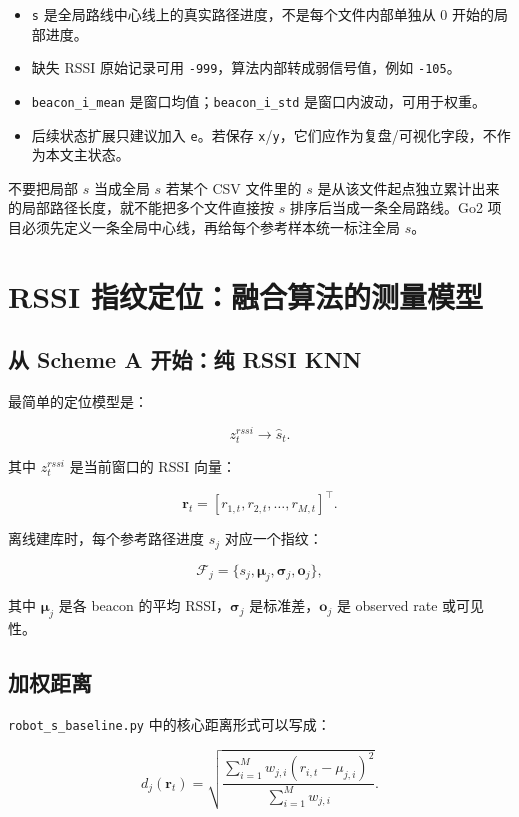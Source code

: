 \documentclass[11pt,a4paper,openany]{report}
\newcommand{\code}[1]{\nolinkurl{#1}}
\newcommand{\file}[1]{\nolinkurl{#1}}
\newcommand{\csvcol}[1]{\nolinkurl{#1}}
\begin{document}
\begin{itemize}
  \item \csvcol{s} 是全局路线中心线上的真实路径进度，不是每个文件内部单独从 0 开始的局部进度。
  \item 缺失 RSSI 原始记录可用 \code{-999}，算法内部转成弱信号值，例如 \code{-105}。
  \item \csvcol{beacon_i_mean} 是窗口均值；\csvcol{beacon_i_std} 是窗口内波动，可用于权重。
  \item 后续状态扩展只建议加入 \csvcol{e}。若保存 \csvcol{x}/\csvcol{y}，它们应作为复盘/可视化字段，不作为本文主状态。
\end{itemize}

\begin{warnbox}{不要把局部 \(s\) 当成全局 \(s\)}
若某个 CSV 文件里的 \(s\) 是从该文件起点独立累计出来的局部路径长度，就不能把多个文件直接按 \(s\) 排序后当成一条全局路线。Go2 项目必须先定义一条全局中心线，再给每个参考样本统一标注全局 \(s\)。
\end{warnbox}

\chapter{RSSI 指纹定位：融合算法的测量模型}
\label{chap:rssi}

\section{从 Scheme A 开始：纯 RSSI KNN}

最简单的定位模型是：

\[
  z_t^{rssi} \rightarrow \hat{s}_t.
\]

其中 \(z_t^{rssi}\) 是当前窗口的 RSSI 向量：

\[
  \bm{r}_t =
  [r_{1,t}, r_{2,t}, \ldots, r_{M,t}]^\top.
\]

离线建库时，每个参考路径进度 \(s_j\) 对应一个指纹：

\[
  \mathcal{F}_j =
  \{s_j, \bm{\mu}_j, \bm{\sigma}_j, \bm{o}_j\},
\]

其中 \(\bm{\mu}_j\) 是各 beacon 的平均 RSSI，\(\bm{\sigma}_j\) 是标准差，\(\bm{o}_j\) 是 observed rate 或可见性。

\section{加权距离}

\file{robot_s_baseline.py} 中的核心距离形式可以写成：

\[
  d_j(\bm{r}_t)
  =
  \sqrt{
    \frac{
      \sum_{i=1}^{M} w_{j,i}(r_{i,t}-\mu_{j,i})^2
    }{
      \sum_{i=1}^{M} w_{j,i}
    }
  }.
\]
\end{document}
